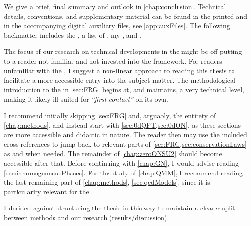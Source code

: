 We give a brief, final summary and outlook in \cref{chap:conclusion}.
Technical details, conventions, and supplementary material can be found in the printed  and in the accompanying digital auxiliary files, see \cref{app:auxFiles}.
The following backmatter includes the , a list of , my , and .\bigskip

The focus of our research on technical developments in the \frg{} might be off-putting to a reader not familiar and not invested into the framework.
For readers unfamiliar with the \frg{}, I suggest a non-linear approach to reading this thesis to facilitate a more accessible entry into the subject matter.
The methodological introduction to the \frg{} in \cref{sec:FRG} begins at, and maintains, a very technical level, making it likely ill-suited for \textit{``first-contact''} on its own.

I recommend initially skipping \cref{sec:FRG} and, arguably, the entirety of \cref{chap:methods}, and instead start with \cref{sec:0dQFT,sec:0dON}, as these sections are more accessible and didactic in nature. 
The reader then may use the included cross-references to jump back to relevant parts of \cref{sec:FRG,sec:conservationLaws} as and when needed.
The remainder of \cref{chap:zeroONSU2} should become accessible after that.
Before continuing with \cref{chap:GN}, I would advise reading \cref{sec:inhomogeneousPhases}. 
For the study of \cref{chap:QMM}, I recommend reading the last remaining part of \cref{chap:methods}, \viz{} \cref{sec:qcdModels}, since it is particularity relevant for the \qmm{}.

I decided against structuring the thesis in this way to maintain a clearer split between methods and our research (results/discussion).\clearpage

